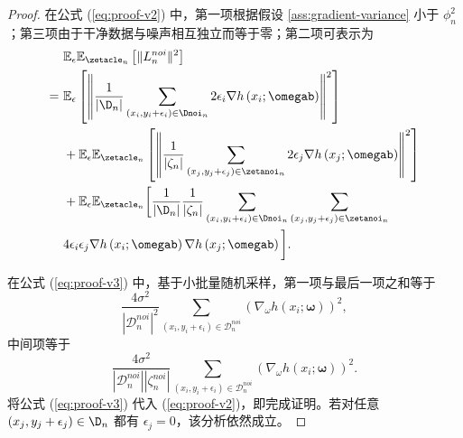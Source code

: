 \begin{proof}
在公式 (\ref{eq:proof-v2}) 中，第一项根据假设 \ref{ass:gradient-variance} 小于 $\phi^2_n$；第三项由于干净数据与噪声相互独立而等于零；第二项可表示为
\begin{align}\label{eq:proof-v3}
   &\mathbb{E}_\epsilon\mathbb{E}_{\zetacle_n}\left[\Vert L_n^{noi}\Vert^2\right] \notag \\
    =~&\mathbb{E}_\epsilon\left[\left\Vert \frac{1}{|\D_n|}\sum_{\left(x_i,y_i+\epsilon_i\right)\in \Dnoi_n}2\epsilon_i\nabla h\left(x_i;\omegab\right)\right\Vert^2\right]\notag \\
    &+\mathbb{E}_\epsilon\mathbb{E}_{\zetacle_n}\left[\left\Vert\frac{1}{|\zeta_n|}\sum_{\left(x_{j},y_j+\epsilon_j\right)\in \zetanoi_n}2\epsilon_j\nabla h\left(x_j;\omegab\right)\right\Vert^2\right]\notag \\
    &+\mathbb{E}_\epsilon\mathbb{E}_{\zetacle_n}\biggl[ \frac{1}{|\D_n|}\frac{1}{|\zeta_n|}\sum_{\left(x_i,y_i+\epsilon_i\right)\in \Dnoi_n}\sum_{\left(x_j,y_j+\epsilon_j\right)\in \zetanoi_n}\notag \\
    &4\epsilon_i\epsilon_j\nabla h\left(x_i;\omegab\right)\nabla h\left(x_j;\omegab\right)\biggl].
\end{align}

在公式 (\ref{eq:proof-v3}) 中，基于小批量随机采样，第一项与最后一项之和等于
$$
\frac{4\sigma^2}{|\mathcal{D}_n^{noi}|^2}\sum_{\left(x_{i},y_{i}+\epsilon_{i}\right)\in \mathcal{D}_n^{noi}}\left(\nabla_\omega  h\left(x_{i};\boldsymbol{\omega}\right)\right)^2,
$$
中间项等于
$$
\frac{4\sigma^2}{|\mathcal{D}_n^{noi}||\zeta_n^{noi}|}\sum_{\left(x_{i},y_{i}+\epsilon_{i}\right)\in \mathcal{D}_n^{noi}}\left(\nabla_\omega  h\left(x_{i};\boldsymbol{\omega}\right)\right)^2.
$$
将公式 (\ref{eq:proof-v3}) 代入 (\ref{eq:proof-v2})，即完成证明。若对任意 $\left(x_j,y_j+\epsilon_j\right)\in\D_n$ 都有 $\epsilon_j=0$，该分析依然成立。
\end{proof}
